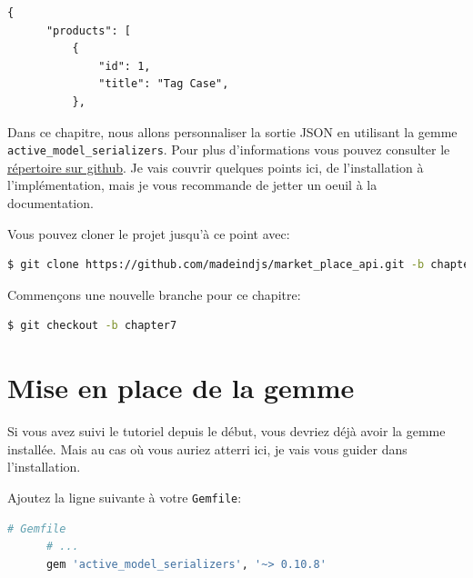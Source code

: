 \documentclass[]{report}
\begin{document}
  \begin{scriptsize}
    \begin{lstlisting}[caption={Exemple d'une belle sortie JSON pour la route products}, label={lst:wanted_products_json}]
    {
      "products": [
          {
              "id": 1,
              "title": "Tag Case",
          },
    \end{lstlisting}
  \end{scriptsize}

  Dans ce chapitre, nous allons personnaliser la sortie JSON en utilisant la gemme \verb|active_model_serializers|. Pour plus d'informations vous pouvez consulter le \href{https://github.com/rails-api/active_model_serializers}{répertoire sur github}. Je vais couvrir quelques points ici, de l'installation à l'implémentation, mais je vous recommande de jetter un oeuil à la documentation.

  Vous pouvez cloner le projet jusqu'à ce point avec:

  \begin{scriptsize}
    \begin{lstlisting}[language=bash]
    $ git clone https://github.com/madeindjs/market_place_api.git -b chapter6
    \end{lstlisting}
  \end{scriptsize}

  Commençons une nouvelle branche pour ce chapitre:

  \begin{scriptsize}
    \begin{lstlisting}[language=bash]
    $ git checkout -b chapter7
    \end{lstlisting}
  \end{scriptsize}

  \section{Mise en place de la gemme}

    Si vous avez suivi le tutoriel depuis le début, vous devriez déjà avoir la gemme installée. Mais au cas où vous auriez atterri ici, je vais vous guider dans l'installation.

    Ajoutez la ligne suivante à votre \verb|Gemfile|:

    \begin{scriptsize}
      \begin{lstlisting}[language=ruby]
      # Gemfile
      # ...
      gem 'active_model_serializers', '~> 0.10.8'
      \end{lstlisting}
    \end{scriptsize}
\end{document}
